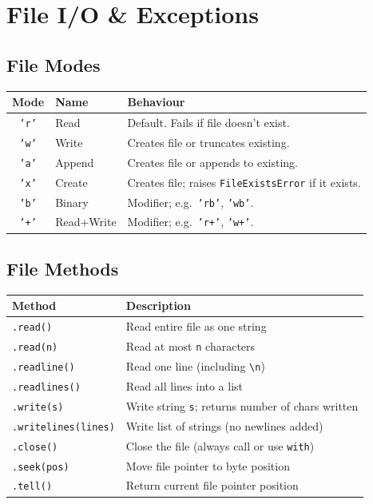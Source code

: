\documentclass[oneside]{book}
\begin{document}
\section{File I/O \& Exceptions}

\subsection*{File Modes}

\begin{center}
\begin{tabularx}{\linewidth}{clX}
\toprule
\textbf{Mode} & \textbf{Name} & \textbf{Behaviour} \\
\midrule
\texttt{'r'}  & Read     & Default. Fails if file doesn't exist. \\
\texttt{'w'}  & Write    & Creates file or truncates existing. \\
\texttt{'a'}  & Append   & Creates file or appends to existing. \\
\texttt{'x'}  & Create   & Creates file; raises \texttt{FileExistsError} if it exists. \\
\texttt{'b'}  & Binary   & Modifier; e.g.\ \texttt{'rb'}, \texttt{'wb'}. \\
\texttt{'+'}  & Read+Write & Modifier; e.g.\ \texttt{'r+'}, \texttt{'w+'}. \\
\bottomrule
\end{tabularx}
\end{center}

\subsection*{File Methods}

\begin{center}
\begin{tabularx}{\linewidth}{lX}
\toprule
\textbf{Method} & \textbf{Description} \\
\midrule
\texttt{.read()}            & Read entire file as one string \\
\texttt{.read(n)}           & Read at most \texttt{n} characters \\
\texttt{.readline()}        & Read one line (including \texttt{\textbackslash n}) \\
\texttt{.readlines()}       & Read all lines into a list \\
\texttt{.write(s)}          & Write string \texttt{s}; returns number of chars written \\
\texttt{.writelines(lines)} & Write list of strings (no newlines added) \\
\texttt{.close()}           & Close the file (always call or use \texttt{with}) \\
\texttt{.seek(pos)}         & Move file pointer to byte position \\
\texttt{.tell()}            & Return current file pointer position \\
\bottomrule
\end{tabularx}
\end{center}
\end{document}
